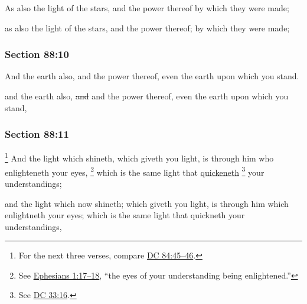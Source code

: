 		As also the light of the stars, and the power thereof by which they were made;

		\begin{framed}
		\scriptsize
			\begin{compactdesc}
				\item[JSP] as also the light of the stars, and the power thereof; by which they were made;
			\end{compactdesc}
		\end{framed}

	\subsubsection{Section 88:10} %
		\label{DC88-10}

		And the earth also, and the power thereof, even the earth upon which you stand.

		\begin{framed}
		\scriptsize
			\begin{compactdesc}
				\item[JSP] and the earth also, \sout{and} and the power thereof, even the earth upon which you stand,
			\end{compactdesc}
		\end{framed}

	\subsubsection{Section 88:11} %
		\label{DC88-11}

			\footnote{%
				For the next three verses, compare \hyperref[DC84-45]{DC 84:45--46}.
				}%
		And the light which shineth, which giveth you light, is through him who enlighteneth your eyes,%
			\footnote{%
				\label{DC88-11-enlighteneth}%
				See \hyperref[EPHESIANS-1-17]{Ephesians 1:17--18}, ``the eyes of your understanding being enlightened.'' 
				}
		which is the same light that \hyperref[QUICKEN]{quickeneth}%
			\footnote{%
				See \hyperref[DC33-16]{DC 33:16}.
				}
		your understandings;

		\begin{framed}
		\scriptsize
			\begin{compactdesc}
				\item[JSP] and the light which now shineth; which giveth you light, is through him which enlightneth your eyes; which is the same light that quickneth your understandings,
			\end{compactdesc}
		\end{framed}

